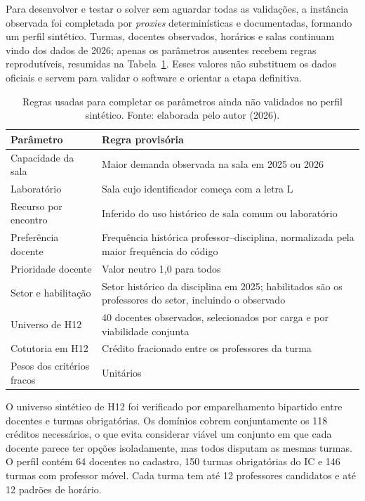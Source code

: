 Para desenvolver e testar o solver sem aguardar todas as validações, a instância observada foi completada por \textit{proxies} determinísticas e documentadas, formando um perfil sintético. Turmas, docentes observados, horários e salas continuam vindo dos dados de 2026; apenas os parâmetros ausentes recebem regras reprodutíveis, resumidas na Tabela~\ref{tab:proxies}. Esses valores não substituem os dados oficiais e servem para validar o software e orientar a etapa definitiva.

\begin{table}[htbp]
  \centering
  \caption{Regras usadas para completar os parâmetros ainda não validados no perfil sintético. Fonte: elaborada pelo autor (2026).}
  \label{tab:proxies}
  \small
  \begin{tabular}{p{4.2cm}p{10.2cm}}
    \toprule
    \textbf{Parâmetro} & \textbf{Regra provisória} \\
    \midrule
    Capacidade da sala & Maior demanda observada na sala em 2025 ou 2026 \\
    Laboratório & Sala cujo identificador começa com a letra L \\
    Recurso por encontro & Inferido do uso histórico de sala comum ou laboratório \\
    Preferência docente & Frequência histórica professor--disciplina, normalizada pela maior frequência do código \\
    Prioridade docente & Valor neutro 1,0 para todos \\
    Setor e habilitação & Setor histórico da disciplina em 2025; habilitados são os professores do setor, incluindo o observado \\
    Universo de H12 & 40 docentes observados, selecionados por carga e por viabilidade conjunta \\
    Cotutoria em H12 & Crédito fracionado entre os professores da turma \\
    Pesos dos critérios fracos & Unitários \\
    \bottomrule
  \end{tabular}
\end{table}

O universo sintético de H12 foi verificado por emparelhamento bipartido entre docentes e turmas obrigatórias. Os domínios cobrem conjuntamente os 118 créditos necessários, o que evita considerar viável um conjunto em que cada docente parece ter opções isoladamente, mas todos disputam as mesmas turmas. O perfil contém 64 docentes no cadastro, 150 turmas obrigatórias do IC e 146 turmas com professor móvel. Cada turma tem até 12 professores candidatos e até 12 padrões de horário.

